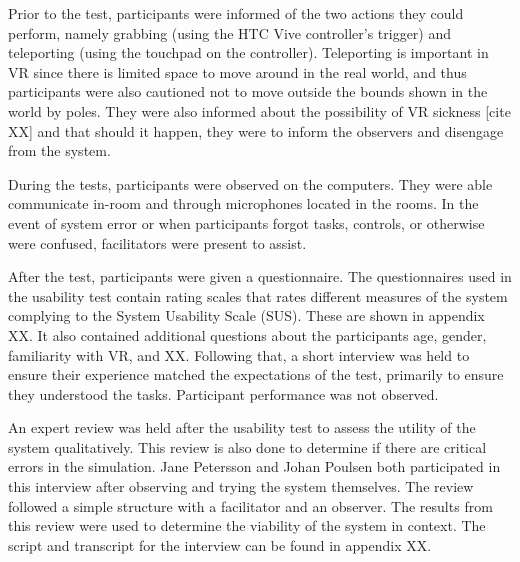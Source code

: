 \documentclass[conference]{IEEEtran}
\begin{document}
Prior to the test, participants were informed of the two actions they could perform, namely grabbing (using the HTC Vive controller's trigger) and teleporting (using the touchpad on the controller). Teleporting is important in VR since there is limited space to move around in the real world, and thus participants were also cautioned not to move outside the bounds shown in the world by poles. They were also informed about the possibility of VR sickness [cite XX] and that should it happen, they were to inform the observers and disengage from the system.

During the tests, participants were observed on the computers. They were able communicate in-room and through microphones located in the rooms. In the event of system error or when participants forgot tasks, controls, or otherwise were confused, facilitators were present to assist. 

After the test, participants were given a questionnaire. The questionnaires used in the usability test contain rating scales that rates different measures of the system complying to the System Usability Scale (SUS). These are shown in appendix XX. It also contained additional questions about the participants age, gender, familiarity with VR, and XX. Following that, a short interview was held to ensure their experience matched the expectations of the test, primarily to ensure they understood the tasks. Participant performance was not observed.

An expert review was held after the usability test to assess the utility of the system qualitatively. This review is also done to determine if there are critical errors in the simulation. Jane Petersson and Johan Poulsen both participated in this interview after observing and trying the system themselves. The review followed a simple structure with a facilitator and an observer. The results from this review were used to determine the viability of the system in context.
The script and transcript for the interview can be found in appendix XX.







%
%
\end{document}
